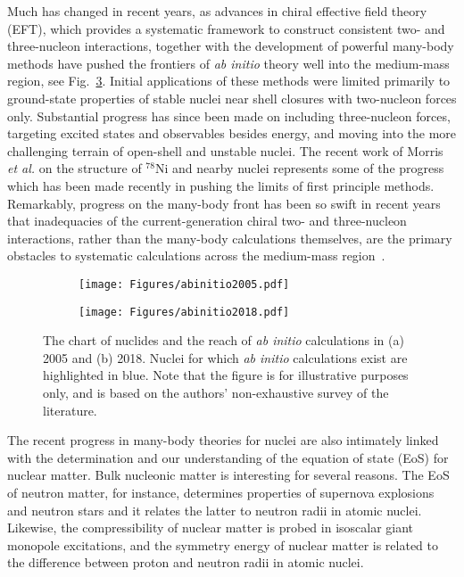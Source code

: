 \documentclass[11pt]{article}
\begin{document}
Much has changed in recent years, as advances in chiral effective
field theory (EFT), which provides a systematic framework to construct
consistent two- and three-nucleon
interactions,
together with the development of powerful many-body methods have
pushed the
frontiers of \emph{ab initio} theory well into the medium-mass
region, see Fig.~\ref{fig:abinitio}. 
Initial applications of these methods were limited primarily to ground-state
properties of stable nuclei near shell closures with two-nucleon
forces only. Substantial progress has since been made on including
three-nucleon forces, targeting excited states and observables besides
energy, and moving into the more
challenging terrain of open-shell and unstable
nuclei. %
The recent work of Morris {\em et al.} \cite{Morris:2017vxi} on the structure of $^{78}$Ni and nearby nuclei represents some of the progress which has been made recently in pushing the limits of first principle methods. Remarkably,
progress on the many-body front has been so swift in recent years that
inadequacies of the current-generation chiral two- and three-nucleon
interactions, rather than the many-body calculations themselves, are
the primary obstacles to systematic calculations across the
medium-mass region~\cite{Ekstrom:2015rta}.

\begin{figure}[hbtp]
\centering
   \begin{subfigure}[t]{.5\textwidth}
   \centering
  \texttt{[image: Figures/abinitio2005.pdf]}
   \caption{   \label{fig:abinitio2005} }
\end{subfigure}%
\begin{subfigure}[t]{.5\textwidth}
\centering
  \texttt{[image: Figures/abinitio2018.pdf]}
   \caption{\label{fig:abinitio2015}}
\end{subfigure}
\caption{\label{fig:abinitio}The chart of nuclides and the reach of \emph{ab initio} calculations in (a) 2005 and (b) 2018. Nuclei for which \emph{ab initio} calculations exist are highlighted in blue. Note that the figure is for illustrative purposes only, and is based on the authors' non-exhaustive survey of the literature.}
\end{figure}

The recent progress in many-body theories for nuclei are also
intimately linked with the determination and our understanding of the
equation of state (EoS) for nuclear matter.  Bulk nucleonic matter is
interesting for several reasons. The EoS of neutron matter, for
instance, determines properties of supernova explosions and neutron
stars and it relates the latter to neutron radii in atomic
nuclei. Likewise, the compressibility of nuclear matter is probed in
isoscalar giant monopole excitations, and the symmetry energy of
nuclear matter is related to the difference between proton and neutron
radii in atomic nuclei.
\end{document}
